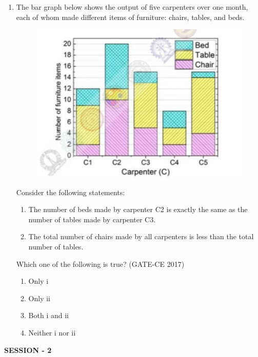 \documentclass[journal,12pt,onecolumn]{article}
\theoremstyle{remark}
\begin{document}
\begin{enumerate}
    \item The bar graph below shows the output of five carpenters over one month, each of whom made different items of furniture: chairs, tables, and beds. 
    \begin{figure}[H]
    \centering
    \includegraphics[width=0.7\columnwidth]{figs/imageq65.jpg}  
    \caption{}
    \label{fig:12}
    \end{figure}
    Consider the following statements:
    \begin{enumerate}
        \item The number of beds made by carpenter C2 is exactly the same as the number of tables made by carpenter C3.
        \item The total number of chairs made by all carpenters is less than the total number of tables.
    \end{enumerate}
    Which one of the following is true? \hfill (GATE-CE 2017)
    \begin{multicols}{2}
    \begin{enumerate}
        \item Only i
        \item Only ii
        \item Both i and ii
        \item Neither i nor ii
    \end{enumerate}
    \end{multicols}
\end{enumerate}



\textbf{SESSION - 2}
\end{document}
